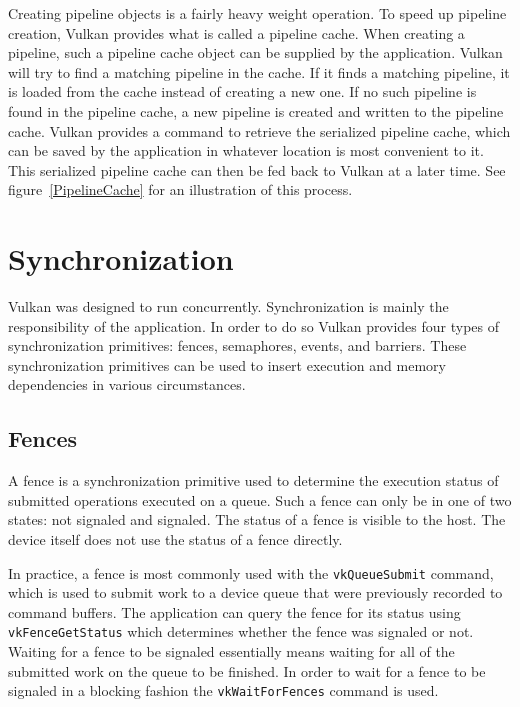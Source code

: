       Creating pipeline objects is a fairly heavy weight operation. To speed up pipeline creation, Vulkan provides what is called a pipeline cache. When creating a pipeline, such a pipeline cache object can be supplied by the application. Vulkan will try to find a matching pipeline in the cache. If it finds a matching pipeline, it is loaded from the cache instead of creating a new one. If no such pipeline is found in the pipeline cache, a new pipeline is created and written to the pipeline cache. Vulkan provides a command to retrieve the serialized pipeline cache, which can be saved by the application in whatever location is most convenient to it. This serialized pipeline cache can then be fed back to Vulkan at a later time. See figure~\ref{PipelineCache} for an illustration of this process.


  \section{Synchronization}

    Vulkan was designed to run concurrently. Synchronization is mainly the responsibility of the application. In order to do so Vulkan provides four types of synchronization primitives: fences, semaphores, events, and barriers. These synchronization primitives can be used to insert execution and memory dependencies in various circumstances.


    \subsection{Fences}
    \label{sub:Fences}
      A fence is a synchronization primitive used to determine the execution status of submitted operations executed on a queue. Such a fence can only be in one of two states: not signaled and signaled. The status of a fence is visible to the host. The device itself does not use the status of a fence directly.

      In practice, a fence is most commonly used with the \lstinline{vkQueueSubmit} command, which is used to submit work to a device queue that were previously recorded to command buffers. The application can query the fence for its status using \lstinline{vkFenceGetStatus} which determines whether the fence was signaled or not. Waiting for a fence to be signaled essentially means waiting for all of the submitted work on the queue to be finished. In order to wait for a fence to be signaled in a blocking fashion the \lstinline{vkWaitForFences} command is used.

